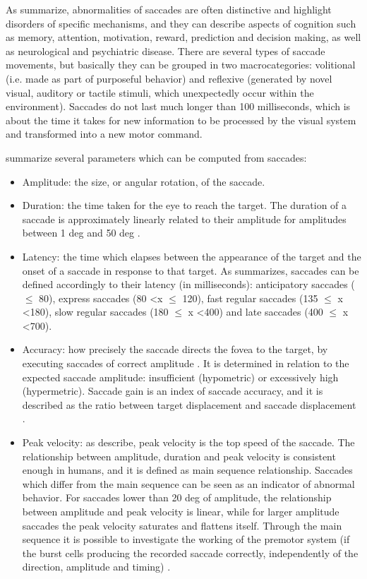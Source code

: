 As \citet[pp. 170-171]{leigh2015neurology} summarize, abnormalities of saccades are often distinctive and highlight disorders of specific mechanisms, and they can describe aspects of cognition such as memory, attention, motivation, reward, prediction and decision making, as well as neurological and psychiatric disease. There are several types of saccade movements, but basically they can be grouped in two macrocategories: volitional (i.e. made as part of purposeful behavior) and reflexive (generated by novel visual, auditory or tactile stimuli, which unexpectedly occur within the environment). Saccades do not last much longer than 100 milliseconds, which is about the time it takes for new information to be processed by the visual system and transformed into a new motor command.

\cite{brenner2007visualsearch} summarize several parameters which can be computed from saccades:
\begin{itemize}
    \item Amplitude: the size, or angular rotation, of the saccade.
    \item Duration: the time taken for the eye to reach the target. The duration of a saccade is approximately linearly related to their amplitude for amplitudes between 1 deg and 50 deg \citep[p. 172]{leigh2015neurology}.
    \item Latency: the time which elapses between the appearance of the target and the onset of a saccade in response to that target. As \cite{smyrnis2008guidelines} summarizes, saccades can be defined accordingly to their latency (in milliseconds): anticipatory saccades ( \(\leq\) 80), express saccades (80 \textless x \(\leq\) 120), fast regular saccades (135 \(\leq\) x \textless 180), slow regular saccades (180 \(\leq\) x \textless 400) and late saccades (400 \(\leq\) x \textless 700). 
    \item Accuracy: how precisely the saccade directs the fovea to the target, by executing saccades of correct amplitude \citep{pensiero2009saccades}. It is determined in relation to the expected saccade amplitude: insufficient (hypometric) or excessively high (hypermetric). Saccade gain is an index of saccade accuracy, and it is described as the ratio between target displacement and saccade displacement \citep{johnson2016review}.
    \item Peak velocity: as \citet[pp. 171-172]{leigh2015neurology} describe, peak velocity is the top speed of the saccade. The relationship between amplitude, duration and peak velocity is consistent enough in humans, and it is defined as main sequence relationship. Saccades which differ from the main sequence can be seen as an indicator of abnormal behavior. For saccades lower than 20 deg of amplitude, the relationship between amplitude and peak velocity is linear, while for larger amplitude saccades the peak velocity saturates and flattens itself. Through the main sequence it is possible to investigate the working of the premotor system (if the burst cells producing the recorded saccade correctly, independently of the direction, amplitude and timing) \citep{pensiero2009saccades}.
\end{itemize}

